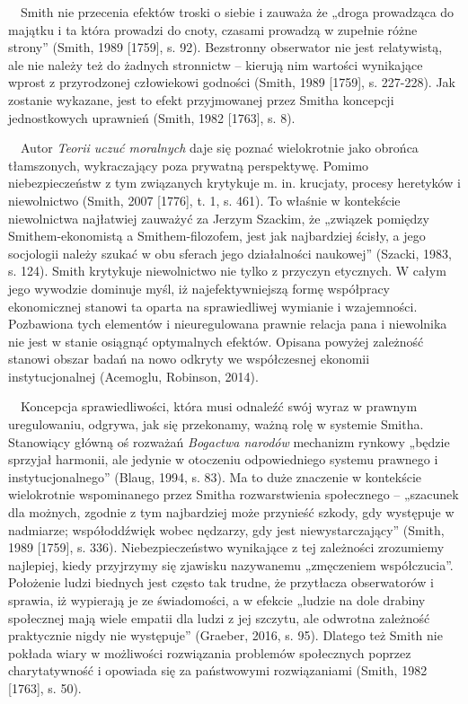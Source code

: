 \documentclass[a4paper]{article}
\begin{document}
 \ \  Smith nie przecenia efektów troski o siebie i zauważa że „droga prowadząca do majątku i ta która prowadzi do
cnoty, czasami prowadzą w zupełnie różne strony” \label{ref:RNDo3EelCAtEP}(Smith, 1989 [1759], s. 92). Bezstronny
obserwator nie jest relatywistą, ale nie należy też do żadnych stronnictw – kierują nim wartości wynikające wprost z
przyrodzonej człowiekowi godności \label{ref:RNDCU5LDHfghn}(Smith, 1989 [1759], s. 227-228). Jak zostanie wykazane,
jest to efekt przyjmowanej przez Smitha koncepcji jednostkowych uprawnień \label{ref:RNDBHV5ZarCoy}(Smith, 1982 [1763],
s. 8). 

 \ \ Autor \textit{Teorii uczuć moralnych} daje się poznać wielokrotnie jako obrońca tłamszonych, wykraczający poza
prywatną perspektywę. Pomimo niebezpieczeństw z tym związanych krytykuje m. in. krucjaty, procesy heretyków i
niewolnictwo \label{ref:RNDkKZBWJ1Bu0}(Smith, 2007 [1776], t. 1, s. 461). To właśnie w kontekście niewolnictwa
najłatwiej zauważyć za Jerzym Szackim, że „związek pomiędzy Smithem-ekonomistą a Smithem-filozofem, jest jak
najbardziej ścisły, a jego socjologii należy szukać w obu sferach jego działalności naukowej”
\label{ref:RNDC8VLy7vrzx}(Szacki, 1983, s. 124). Smith krytykuje niewolnictwo nie tylko z przyczyn etycznych. W całym
jego wywodzie dominuje myśl, iż najefektywniejszą formę współpracy ekonomicznej stanowi ta oparta na sprawiedliwej
wymianie i wzajemności. Pozbawiona tych elementów i nieuregulowana prawnie relacja pana i niewolnika nie jest w stanie
osiągnąć optymalnych efektów. Opisana powyżej zależność stanowi obszar badań na nowo odkryty we współczesnej ekonomii
instytucjonalnej \label{ref:RNDvpwxutjCAN}(Acemoglu, Robinson, 2014).

\ \ Koncepcja sprawiedliwości, która musi odnaleźć swój wyraz w prawnym uregulowaniu, odgrywa, jak się przekonamy, ważną
rolę w systemie Smitha. Stanowiący główną oś rozważań \textit{Bogactwa narodów} mechanizm rynkowy „będzie sprzyjał
harmonii, ale jedynie w otoczeniu odpowiedniego systemu prawnego i instytucjonalnego” \label{ref:RNDuJ77RGCwoa}(Blaug,
1994, s. 83). Ma to duże znaczenie w kontekście wielokrotnie wspominanego przez Smitha rozwarstwienia społecznego –
„szacunek dla możnych, zgodnie z tym najbardziej może przynieść szkody, gdy występuje w nadmiarze; współoddźwięk wobec
nędzarzy, gdy jest niewystarczający” \label{ref:RNDu4UprONNkk}(Smith, 1989 [1759], s. 336). Niebezpieczeństwo
wynikające z tej zależności zrozumiemy najlepiej, kiedy przyjrzymy się zjawisku nazywanemu „zmęczeniem współczucia”.
Położenie ludzi biednych jest często tak trudne, że przytłacza obserwatorów i sprawia, iż wypierają je ze świadomości,
a w efekcie „ludzie na dole drabiny społecznej mają wiele empatii dla ludzi z jej szczytu, ale odwrotna zależność
praktycznie nigdy nie występuje” \label{ref:RNDNWyWu164di}(Graeber, 2016, s. 95). Dlatego też Smith nie pokłada wiary w
możliwości rozwiązania problemów społecznych poprzez charytatywność i opowiada się za państwowymi rozwiązaniami
\label{ref:RNDLkHuKp1To6}(Smith, 1982 [1763], s. 50).
\end{document}
